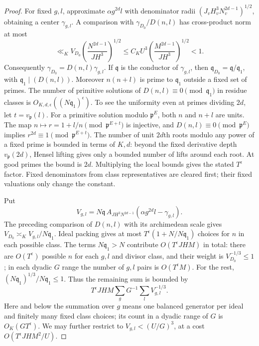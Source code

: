 \documentclass[11pt]{amsart}
\theoremstyle{definition}
\numberwithin{equation}{section}
\begin{document}
\begin{proof}
For fixed $g,l$, approximate $\alpha g^{2d}l$ with denominator radii
$(J_vH_v^3N_v^{2d-1})^{1/2}$, obtaining a center $\gamma_{g,l}$.
A comparison with $\gamma_{D_0}/D(n,l)$ has cross-product norm at most
\[
 \ll_K V_{D_0}
       \left(\frac{N^{2d-1}}{JH^3}\right)^{1/2}
 \le C_K U^3\left(\frac{M^{2d-1}}{JH^3}\right)^{1/2}<1.
\]
Consequently $\gamma_{D_0}=D(n,l)\gamma_{g,l}$.
If $\mathfrak q$ is the conductor of $\gamma_{g,l}$, then
$\mathfrak q_{D_0}=\mathfrak q/\mathfrak q_1$, with
$\mathfrak q_1\mid(D(n,l))$.
Moreover $n(n+l)$ is prime to $\mathfrak q_1$ outside a fixed set of primes.
The number of primitive solutions of $D(n,l)\equiv0\pmod{\mathfrak q_1}$
in residue classes is $O_{K,d,\epsilon}((N\mathfrak q_1)^{\epsilon})$.
To see the uniformity even at primes dividing $2d$, let
$t=v_{\mathfrak p}(l)$.  For a primitive solution modulo $\mathfrak p^E$,
both $n$ and $n+l$ are units.  The map
$n\mapsto r=1+l/n\pmod{\mathfrak p^{E+t}}$ is injective, and
$D(n,l)\equiv0\pmod{\mathfrak p^E}$ implies
$r^{2d}\equiv1\pmod{\mathfrak p^{E+t}}$.
The number of unit $2d$th roots modulo any power of a fixed prime is
bounded in terms of $K,d$: beyond the fixed derivative depth
$v_{\mathfrak p}(2d)$, Hensel lifting gives only a bounded number of
lifts around each root.  At good primes the bound is $2d$.
Multiplying the local bounds gives the stated $T^\epsilon$ factor.
Fixed denominators from class representatives are cleared first; their
fixed valuations only change the constant.

Put
\[
 V_{g,l}=N\mathfrak q\,
 A_{JH^3N^{2d-1}}(\alpha g^{2d}l-\gamma_{g,l}).
\]
The preceding comparison of $D(n,l)$ with its archimedean scale gives
$V_{D_0}\asymp_K V_{g,l}/N\mathfrak q_1$.
Ideal packing gives at most
$T^\epsilon(1+N/N\mathfrak q_1)$ choices for $n$ in each possible class.
The terms $N\mathfrak q_1>N$ contribute $O(T^\epsilon JHM)$ in total:
there are $O(T^\epsilon)$ possible $n$ for each $g,l$ and divisor class,
and their weight is $V_{D_0}^{-1/3}\le1$;
in each dyadic $G$ range the number of $g,l$ pairs is $O(T^\epsilon M)$.
For the rest, $(N\mathfrak q_1)^{1/3}/N\mathfrak q_1\le1$.
Thus the remaining sum is bounded by
\[
 T^\epsilon JHM\sum_gG^{-1}\sum_l V_{g,l}^{-1/3}.
\]
Here and below the summation over $g$ means one balanced generator per
ideal and finitely many fixed class choices; its count in a dyadic range
of $G$ is $O_K(GT^\epsilon)$.
We may further restrict to $V_{g,l}<(U/G)^3$, at a cost
$O(T^\epsilon JHM^2/U)$.


\end{proof}
\end{document}

